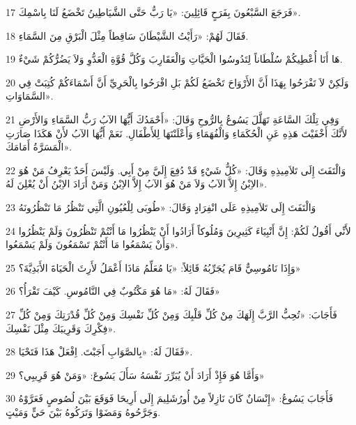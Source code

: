\par 17 فَرَجَعَ السَّبْعُونَ بِفَرَحٍ قَائِلِينَ: «يَا رَبُّ حَتَّى الشَّيَاطِينُ تَخْضَعُ لَنَا بِاسْمِكَ».
\par 18 فَقَالَ لَهُمْ: «رَأَيْتُ الشَّيْطَانَ سَاقِطاً مِثْلَ الْبَرْقِ مِنَ السَّمَاءِ.
\par 19 هَا أَنَا أُعْطِيكُمْ سُلْطَاناً لِتَدُوسُوا الْحَيَّاتِ وَالْعَقَارِبَ وَكُلَّ قُوَّةِ الْعَدُّوِ وَلاَ يَضُرُّكُمْ شَيْءٌ.
\par 20 وَلَكِنْ لاَ تَفْرَحُوا بِهَذَا أَنَّ الأَرْوَاحَ تَخْضَعُ لَكُمْ بَلِ افْرَحُوا بِالْحَرِيِّ أَنَّ أَسْمَاءَكُمْ كُتِبَتْ فِي السَّمَاوَاتِ».
\par 21 وَفِي تِلْكَ السَّاعَةِ تَهَلَّلَ يَسُوعُ بِالرُّوحِ وَقَالَ: «أَحْمَدُكَ أَيُّهَا الآبُ رَبُّ السَّمَاءِ وَالأَرْضِ لأَنَّكَ أَخْفَيْتَ هَذِهِ عَنِ الْحُكَمَاءِ وَالْفُهَمَاءِ وَأَعْلَنْتَهَا لِلأَطْفَالِ. نَعَمْ أَيُّهَا الآبُ لأَنْ هَكَذَا صَارَتِ الْمَسَرَّةُ أَمَامَكَ».
\par 22 وَالْتَفَتَ إِلَى تَلاَمِيذِهِ وَقَالَ: «كُلُّ شَيْءٍ قَدْ دُفِعَ إِلَيَّ مِنْ أَبِي. وَلَيْسَ أَحَدٌ يَعْرِفُ مَنْ هُوَ الاِبْنُ إِلاَّ الآبُ وَلاَ مَنْ هُوَ الآبُ إِلاَّ الاِبْنُ وَمَنْ أَرَادَ الاِبْنُ أَنْ يُعْلِنَ لَهُ».
\par 23 وَالْتَفَتَ إِلَى تَلاَمِيذِهِ عَلَى انْفِرَادٍ وَقَالَ: «طُوبَى لِلْعُيُونِ الَّتِي تَنْظُرُ مَا تَنْظُرُونَهُ
\par 24 لأَنِّي أَقُولُ لَكُمْ: إِنَّ أَنْبِيَاءَ كَثِيرِينَ وَمُلُوكاً أَرَادُوا أَنْ يَنْظُرُوا مَا أَنْتُمْ تَنْظُرُونَ وَلَمْ يَنْظُرُوا وَأَنْ يَسْمَعُوا مَا أَنْتُمْ تَسْمَعُونَ وَلَمْ يَسْمَعُوا».
\par 25 وَإِذَا نَامُوسِيٌّ قَامَ يُجَرِّبُهُ قَائِلاً: «يَا مُعَلِّمُ مَاذَا أَعْمَلُ لأَرِثَ الْحَيَاةَ الأَبَدِيَّةَ؟»
\par 26 فَقَالَ لَهُ: «مَا هُوَ مَكْتُوبٌ فِي النَّامُوسِ. كَيْفَ تَقْرَأُ؟»
\par 27 فَأَجَابَ: «تُحِبُّ الرَّبَّ إِلَهَكَ مِنْ كُلِّ قَلْبِكَ وَمِنْ كُلِّ نَفْسِكَ وَمِنْ كُلِّ قُدْرَتِكَ وَمِنْ كُلِّ فِكْرِكَ وَقَرِيبَكَ مِثْلَ نَفْسِكَ».
\par 28 فَقَالَ لَهُ: «بِالصَّوَابِ أَجَبْتَ. اِفْعَلْ هَذَا فَتَحْيَا».
\par 29 وَأَمَّا هُوَ فَإِذْ أَرَادَ أَنْ يُبَرِّرَ نَفْسَهُ سَأَلَ يَسُوعَ: «وَمَنْ هُوَ قَرِيبِي؟»
\par 30 فَأَجَابَ يَسُوعُ: «إِنْسَانٌ كَانَ نَازِلاً مِنْ أُورُشَلِيمَ إِلَى أَرِيحَا فَوَقَعَ بَيْنَ لُصُوصٍ فَعَرَّوْهُ وَجَرَّحُوهُ وَمَضَوْا وَتَرَكُوهُ بَيْنَ حَيٍّ وَمَيْتٍ.

